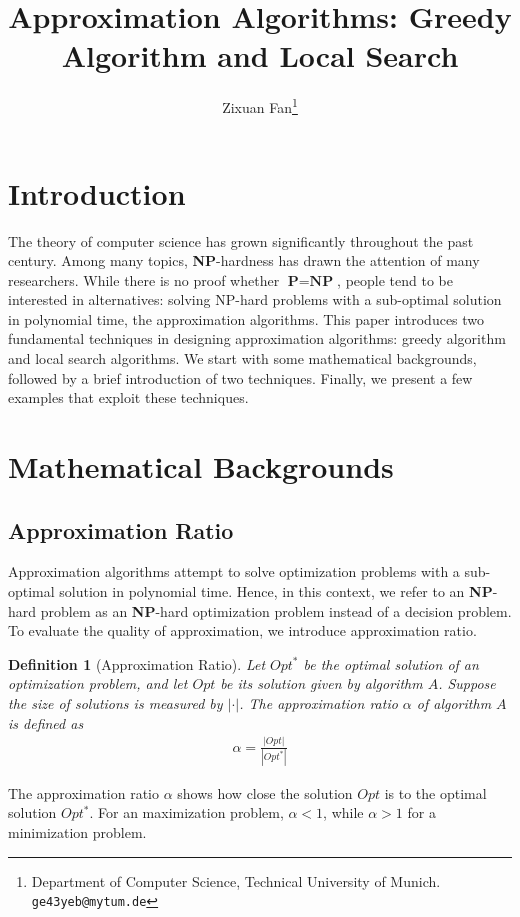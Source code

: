 \documentclass[11pt,psfig,times]{article}
\newcommand*{\PTIME}{\textbf{P}}
\newcommand*{\NP}{\textbf{NP}}
\newtheorem{definition}[theorem]{Definition}
\begin{document}
\title{Approximation Algorithms: Greedy Algorithm and Local Search}
\author{Zixuan Fan\thanks{Department of Computer Science, Technical University of Munich. {\tt ge43yeb@mytum.de}}}
\maketitle
\section{Introduction}
The theory of computer science has grown significantly throughout the past century. Among many topics, \NP-hardness has drawn the attention of many researchers. 
While there is no proof whether $\PTIME=\NP$, people tend to be interested in alternatives: solving NP-hard problems with a sub-optimal solution in polynomial time, 
the approximation algorithms. This paper introduces two fundamental techniques in designing approximation algorithms: greedy algorithm and local search algorithms.
We start with some mathematical backgrounds, followed by a brief introduction of two techniques. 
Finally, we present a few examples that exploit these techniques.

\section{Mathematical Backgrounds}
\subsection{Approximation Ratio}
Approximation algorithms attempt to solve optimization problems with a sub-optimal solution in polynomial time. 
Hence, in this context, we refer to an \NP-hard problem as an \NP-hard optimization problem instead of a decision problem. 
To evaluate the quality of approximation, we introduce approximation ratio.
\begin{definition}[Approximation Ratio]
    Let $Opt^*$ be the optimal solution of an optimization problem, and let $Opt$ be its solution given by algorithm $A$. 
    Suppose the size of solutions is measured by $|\cdot|$. The approximation ratio $\alpha$ of algorithm $A$ is defined as 
    \begin{align*}
        \alpha = \frac{|Opt|}{|Opt^*|}
    \end{align*}
\end{definition}
The approximation ratio $\alpha$ shows how close the solution $Opt$ is to the optimal solution $Opt^*$. For an maximization problem, $\alpha < 1$, while $\alpha > 1$
for a minimization problem.
\end{document}
